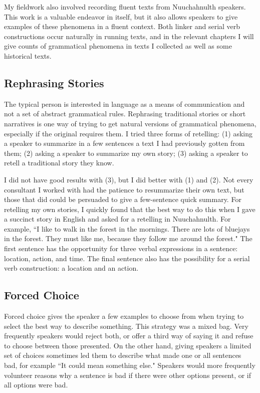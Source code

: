 My fieldwork also involved recording fluent texts from Nuuchahnulth speakers. This work is a valuable endeavor in itself, but it also allows speakers to give examples of these phenomena in a fluent context. Both linker and serial verb constructions occur naturally in running texts, and in the relevant chapters I will give counts of grammatical phenomena in texts I collected as well as some historical texts.

\subsection{Rephrasing Stories}

The typical person is interested in language as a means of communication and not a set of abstract grammatical rules. Rephrasing traditional stories or short narratives is one way of trying to get natural versions of grammatical phenomena, especially if the original requires them. I tried three forms of retelling: (1) asking a speaker to summarize in a few sentences a text I had previously gotten from them; (2) asking a speaker to summarize my own story; (3) asking a speaker to retell a traditional story they know.

I did not have good results with (3), but I did better with (1) and (2). Not every consultant I worked with had the patience to resummarize their own text, but those that did could be persuaded to give a few-sentence quick summary. For retelling my own stories, I quickly found that the best way to do this when I gave a succinct story in English and asked for a retelling in Nuuchahnulth. For example, ``I like to walk in the forest in the mornings. There are lots of bluejays in the forest. They must like me, because they follow me around the forest." The first sentence has the opportunity for three verbal expressions in a sentence: location, action, and time. The final sentence also has the possibility for a serial verb construction: a location and an action.

\subsection{Forced Choice}

Forced choice gives the speaker a few examples to choose from when trying to select the best way to describe something. This strategy was a mixed bag. Very frequently speakers would reject both, or offer a third way of saying it and refuse to choose between those presented. On the other hand, giving speakers a limited set of choices sometimes led them to describe what made one or all sentences bad, for example ``It could mean something else." Speakers would more frequently volunteer reasons why a sentence is bad if there were other options present, or if all options were bad.

